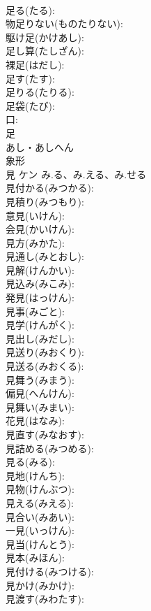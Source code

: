 \documentclass[8pt]{extreport}
\begin{document}
\begin{CJK}{UTF8}{min}
\\	足る(たる): 
\\	物足りない(ものたりない): 
\\	駆け足(かけあし): 
\\	足し算(たしざん): 
\\	裸足(はだし): 
\\	足す(たす): 
\\	足りる(たりる): 
\\	足袋(たび): 
\\	口: 
\\	足	
\\	あし・あしへん	
\\	象形 
\\	見	ケン	み.る、み.える、み.せる		
\\	見付かる(みつかる): 
\\	見積り(みつもり): 
\\	意見(いけん): 
\\	会見(かいけん): 
\\	見方(みかた): 
\\	見通し(みとおし): 
\\	見解(けんかい): 
\\	見込み(みこみ): 
\\	発見(はっけん): 
\\	見事(みごと): 
\\	見学(けんがく): 
\\	見出し(みだし): 
\\	見送り(みおくり): 
\\	見送る(みおくる): 
\\	見舞う(みまう): 
\\	偏見(へんけん): 
\\	見舞い(みまい): 
\\	花見(はなみ): 
\\	見直す(みなおす): 
\\	見詰める(みつめる): 
\\	見る(みる): 
\\	見地(けんち): 
\\	見物(けんぶつ): 
\\	見える(みえる): 
\\	見合い(みあい): 
\\	一見(いっけん): 
\\	見当(けんとう): 
\\	見本(みほん): 
\\	見付ける(みつける): 
\\	見かけ(みかけ): 
\\	見渡す(みわたす): 

\end{CJK}
\end{document}
